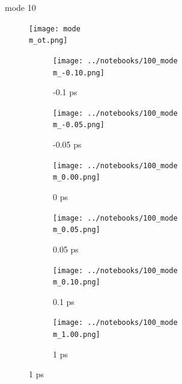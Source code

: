 \documentclass{beamer}
\newcommand\w{0.32}
\begin{document}
\renewcommand\m{10}
\begin{frame}{mode \m}
		\vspace{\vh mm}
	\begin{figure}
		\centering
		\texttt{[image: mode\\m\_ot.png]}
	\end{figure}
	\begin{figure}
		\centering
		\begin{subfigure}[b]{\w\textwidth}
			\centering
			\texttt{[image: ../notebooks/100\_mode\\m\_-0.10.png]}
			\caption{-0.1 ps}
		\end{subfigure}
		\begin{subfigure}[b]{\w\textwidth}
			\centering
			\texttt{[image: ../notebooks/100\_mode\\m\_-0.05.png]}
			\caption{-0.05 ps}
		\end{subfigure}
		\begin{subfigure}[b]{\w\textwidth}
			\centering
			\texttt{[image: ../notebooks/100\_mode\\m\_0.00.png]}
			\caption{0 ps}
		\end{subfigure}
		\begin{subfigure}[b]{\w\textwidth}
			\centering
			\texttt{[image: ../notebooks/100\_mode\\m\_0.05.png]}
			\caption{0.05 ps}
		\end{subfigure}
		\begin{subfigure}[b]{\w\textwidth}
			\centering
			\texttt{[image: ../notebooks/100\_mode\\m\_0.10.png]}
			\caption{0.1 ps}
		\end{subfigure}
		\begin{subfigure}[b]{\w\textwidth}
			\centering
			\texttt{[image: ../notebooks/100\_mode\\m\_1.00.png]}
			\caption{1 ps}
		\end{subfigure}
	\end{figure}
\end{frame}
\end{document}
